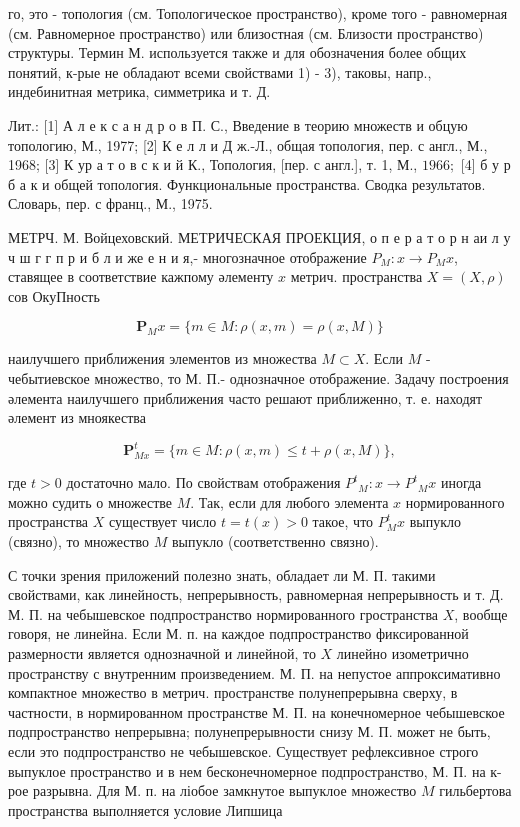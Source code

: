 \documentclass[10pt]{article}
\begin{document}
го, это - топология (см. Топологическое пространство), кроме того - равномерная (см. Равномерное пространство) или близостная (см. Близости пространство) структуры. Термин М. используется также и для обозначения более общих понятий, к-рые не обладают всеми свойствами 1) - 3), таковы, напр., индебинитная метрика, симметрика и т. Д.



Лит.: [1] А л е к с а н д р о в П. С., Введение в теорию множеств и обцую топологию, М., 1977; [2] К е л л и Д ж.-Л., общая топология, пер. с англ., М., 1968; [3] К ур а т о в с к и й К., Топология, [пер. с англ.], т. 1, М., $1966 ;$ [4] б у р б а к и общей топология. Функциональные пространства. Сводка результатов. Словарь, пер. с франц., М., 1975.



МЕТРЧ. М. Войцеховский. МЕТРИЧЕСКАЯ ПРОЕКЦИЯ, о п е р а т о р н аи л у ч ш г г п р и б л и же е н и я,- многозначное отображение $P_{M}: x \rightarrow P_{M} x$, ставящее в соответствие кажпому әлементу $x$ метрич. пространства $X=(X, \rho)$ сов ОкуПность



\[

\boldsymbol{P}_{M} x=\{m \in M: \rho(x, m)=\rho(x, M)\}

\]



наилучшего приближения элементов из множества $M \subset X$. Если $M$ - чебытиевское множество, то М. П.- однозначное отображение. Задачу построения әлемента наилучшего приближения часто решают приближенно, т. е. находят әлемент из мноякества



\[

\boldsymbol{P}_{M x}^{t}=\{m \in M: \rho(x, m) \leqslant t+\rho(x, M)\},

\]



где $t>0$ достаточно мало. По свойствам отображения $P^{t}{ }_{M}: x \rightarrow P^{t}{ }_{M} x$ иногда можно судить о множестве $M$. Так, если для любого элемента $x$ нормированного пространства $X$ существует число $t=t(x)>0$ такое, что $P_{M}^{t} x$ выпукло (связно), то множество $M$ выпукло (соответственно связно).



С точки зрения приложений полезно знать, обладает ли М. П. такими свойствами, как линейность, непрерывность, равномерная непрерывность и т. Д. М. П. на чебышевское подпространство нормированного гространства $X$, вообще говоря, не линейна. Если М. п. на каждое подпространство фиксированной размерности является однозначной и линейной, то $X$ линейно изометрично пространству с внутренним произведением. М. П. на непустое аппроксимативно компактное множество в метрич. пространстве полунепрерывна сверху, в частности, в нормированном пространстве М. П. на конечномерное чебышевское подпространство непрерывна; полунепрерывности снизу М. П. может не быть, если это подпространство не чебышевское. Существует рефлексивное строго выпуклое пространство и в нем бесконечномерное подпространство, М. П. на к-рое разрывна. Для М. п. на ліобое замкнутое выпуклое множество $M$ гильбертова пространства выполняется условие Липшица
\end{document}
